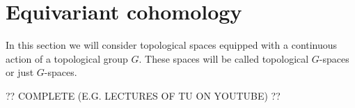 \section{Equivariant cohomology}

    In this section we will consider topological spaces equipped with a continuous action of a topological group $G$. These spaces will be called topological $G$-spaces or just $G$-spaces.


    ?? COMPLETE (E.G. LECTURES OF TU ON YOUTUBE) ??